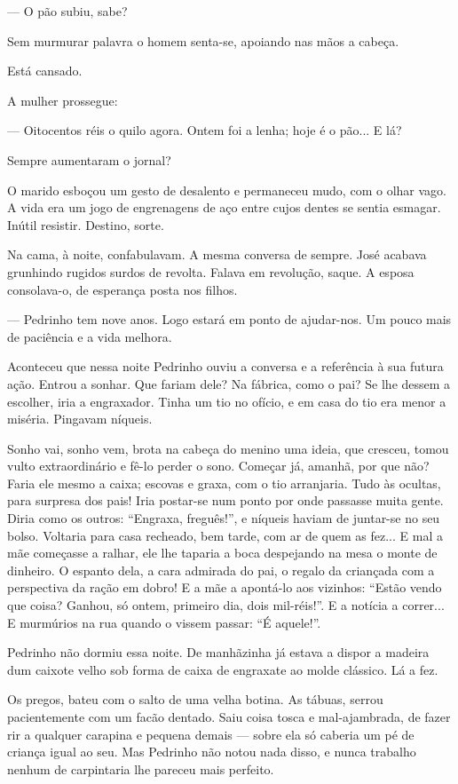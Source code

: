 --- O pão subiu, sabe?

Sem murmurar palavra o homem senta-se, apoiando nas mãos a cabeça.

Está cansado.

A mulher prossegue:

--- Oitocentos réis o quilo agora. Ontem foi a lenha; hoje é o pão... E
lá?

Sempre aumentaram o jornal?

O marido esboçou um gesto de desalento e permaneceu mudo, com o olhar
vago. A vida era um jogo de engrenagens de aço entre cujos dentes se
sentia esmagar. Inútil resistir. Destino, sorte.

Na cama, à noite, confabulavam. A mesma conversa de sempre. José acabava
grunhindo rugidos surdos de revolta. Falava em revolução, saque. A
esposa consolava-o, de esperança posta nos filhos.

--- Pedrinho tem nove anos. Logo estará em ponto de ajudar-nos. Um pouco
mais de paciência e a vida melhora.

Aconteceu que nessa noite Pedrinho ouviu a conversa e a referência à sua
futura ação. Entrou a sonhar. Que fariam dele? Na fábrica, como o pai?
Se lhe dessem a escolher, iria a engraxador. Tinha um tio no ofício, e
em casa do tio era menor a miséria. Pingavam níqueis.

Sonho vai, sonho vem, brota na cabeça do menino uma ideia, que cresceu,
tomou vulto extraordinário e fê-lo perder o sono. Começar já, amanhã,
por que não? Faria ele mesmo a caixa; escovas e graxa, com o tio
arranjaria. Tudo às ocultas, para surpresa dos pais! Iria postar-se num
ponto por onde passasse muita gente. Diria como os outros: ``Engraxa,
freguês!'', e níqueis haviam de juntar-se no seu bolso. Voltaria para
casa recheado, bem tarde, com ar de quem as fez... E mal a mãe começasse
a ralhar, ele lhe taparia a boca despejando na mesa o monte de dinheiro.
O espanto dela, a cara admirada do pai, o regalo da criançada com a
perspectiva da ração em dobro! E a mãe a apontá-lo aos vizinhos: ``Estão
vendo que coisa? Ganhou, só ontem, primeiro dia, dois mil-réis!''. E a
notícia a correr... E murmúrios na rua quando o vissem passar: ``É
aquele!''.

Pedrinho não dormiu essa noite. De manhãzinha já estava a dispor a
madeira dum caixote velho sob forma de caixa de engraxate ao molde
clássico. Lá a fez.

Os pregos, bateu com o salto de uma velha botina. As tábuas, serrou
pacientemente com um facão dentado. Saiu coisa tosca e mal-ajambrada, de
fazer rir a qualquer carapina e pequena demais --- sobre ela só caberia
um pé de criança igual ao seu. Mas Pedrinho não notou nada disso, e
nunca trabalho nenhum de carpintaria lhe pareceu mais perfeito.


